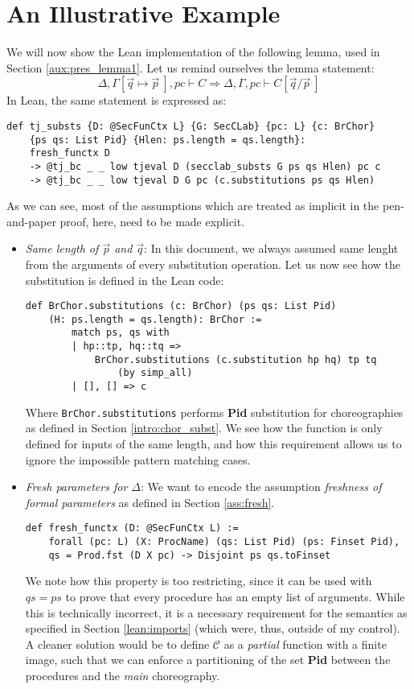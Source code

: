\documentclass[12pt,a4paper,twoside]{book}
\begin{document}
\section{An Illustrative Example}
We will now show the Lean implementation of the following lemma, used in Section \ref{aux:pres_lemma1}. Let us remind ourselves the lemma statement:
\begin{equation*}
\Delta, \Gamma[\vec{q}\mapsto\vec{p}~], pc \vdash C \Longrightarrow
\Delta, \Gamma, pc \vdash C[\vec{q}/\vec{p}~]
\end{equation*}
In Lean, the same statement is expressed as:
\begin{samepage}
\begin{verbatim}
def tj_substs {D: @SecFunCtx L} {G: SecCLab} {pc: L} {c: BrChor}
    {ps qs: List Pid} {Hlen: ps.length = qs.length}:
    fresh_functx D
    -> @tj_bc _ _ low tjeval D (secclab_substs G ps qs Hlen) pc c
    -> @tj_bc _ _ low tjeval D G pc (c.substitutions ps qs Hlen)
\end{verbatim}
\end{samepage}
As we can see, most of the assumptions which are treated as implicit in the pen-and-paper proof, here, need to be made explicit.
\begin{itemize}
\item \emph{Same length of $\vec{p}$ and $\vec{q}$}: In this document, we always assumed same lenght from the arguments of every substitution operation. Let us now see how the substitution is defined in the Lean code:
\begin{verbatim}
def BrChor.substitutions (c: BrChor) (ps qs: List Pid)
    (H: ps.length = qs.length): BrChor :=
        match ps, qs with
        | hp::tp, hq::tq =>
            BrChor.substitutions (c.substitution hp hq) tp tq
                (by simp_all)
        | [], [] => c
\end{verbatim}
Where \texttt{BrChor.substitutions} performs \textbf{Pid} substitution for choreographies as defined in Section \ref{intro:chor_subst}.
We see how the function is only defined for inputs of the same length, and how this requirement allows us to ignore the impossible pattern matching cases.

\item \emph{Fresh parameters for $\Delta$}:
We want to encode the assumption \emph{freshness of formal parameters} as defined in Section \ref{ass:fresh}.
\begin{verbatim}
def fresh_functx (D: @SecFunCtx L) :=
    forall (pc: L) (X: ProcName) (qs: List Pid) (ps: Finset Pid),
    qs = Prod.fst (D X pc) -> Disjoint ps qs.toFinset
\end{verbatim}
We note how this property is too restricting, since it can be used with $qs = ps$ to prove that every procedure has an empty list of arguments. While this is technically incorrect, it is a necessary requirement for the semantics as specified in Section \ref{lean:imports} (which were, thus, outside of my control). A cleaner solution would be to define $\mathscr{C}$ as a \emph{partial} function with a finite image, such that we can enforce a partitioning of the set \textbf{Pid} between the procedures and the \emph{main} choreography.
\end{itemize}
\end{document}
